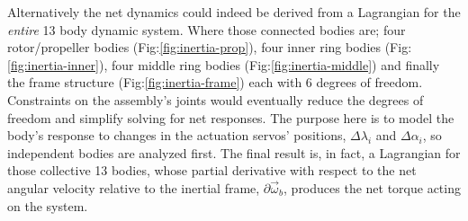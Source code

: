 \par
Alternatively the net dynamics could indeed be derived from a Lagrangian for the \emph{entire} 13 body dynamic system. Where those connected bodies are; four rotor/propeller bodies (Fig:\ref{fig:inertia-prop}), four inner ring bodies (Fig:\ref{fig:inertia-inner}), four middle ring bodies (Fig:\ref{fig:inertia-middle}) and finally the frame structure (Fig:\ref{fig:inertia-frame}) each with 6 degrees of freedom. Constraints on the assembly's joints would eventually reduce the degrees of freedom and simplify solving for net responses. The purpose here is to model the body's response to changes in the actuation servos' positions, $\Delta\lambda_i$ and $\Delta\alpha_i$, so independent bodies are analyzed first. The final result is, in fact, a Lagrangian for those collective 13 bodies, whose partial derivative with respect to the net angular velocity relative to the inertial frame, $\partial\vec{\omega}_b$, produces the net torque acting on the system.
